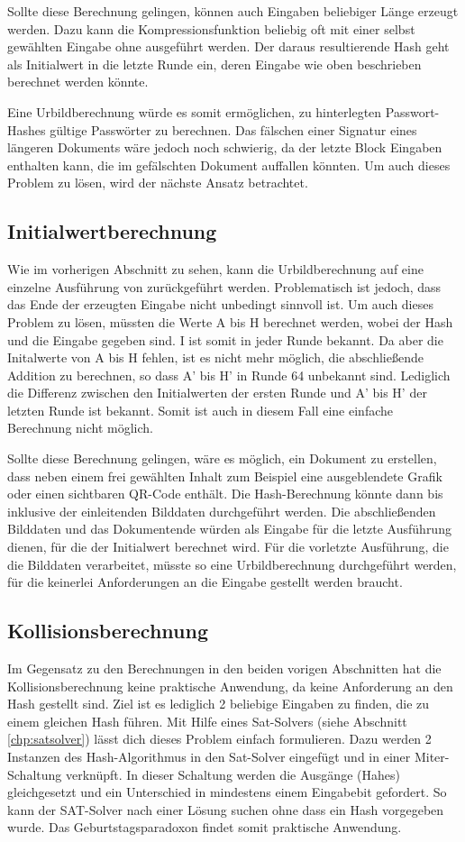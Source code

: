 Sollte diese Berechnung gelingen, können auch Eingaben beliebiger Länge erzeugt werden. Dazu kann die Kompressionsfunktion beliebig oft mit einer selbst gewählten Eingabe
ohne  ausgeführt werden. Der daraus resultierende Hash geht als Initialwert in die letzte Runde ein, deren Eingabe wie oben beschrieben berechnet werden könnte.

Eine Urbildberechnung würde es somit ermöglichen, zu hinterlegten Passwort-Hashes gültige Passwörter zu berechnen. Das fälschen einer Signatur eines längeren Dokuments
wäre jedoch noch schwierig, da der letzte Block Eingaben enthalten kann, die im gefälschten Dokument auffallen könnten. Um auch dieses Problem zu lösen, wird der nächste
Ansatz betrachtet.

\subsection{Initialwertberechnung}
Wie im vorherigen Abschnitt zu sehen, kann die Urbildberechnung auf eine einzelne Ausführung von  zurückgeführt werden.
Problematisch ist jedoch, dass das Ende der erzeugten Eingabe nicht unbedingt sinnvoll ist. Um auch dieses Problem zu lösen, müssten
die Werte A bis H berechnet werden, wobei der Hash und die Eingabe gegeben sind. I ist somit in jeder Runde bekannt. Da aber die Initalwerte
von A bis H fehlen, ist es nicht mehr möglich, die abschließende Addition zu berechnen, so dass A' bis H' in Runde 64 unbekannt sind. Lediglich
die Differenz zwischen den Initialwerten der ersten Runde und A' bis H' der letzten Runde ist bekannt. Somit ist auch in diesem Fall eine
einfache Berechnung nicht möglich.

Sollte diese Berechnung gelingen, wäre es möglich, ein Dokument zu erstellen, dass neben einem frei gewählten Inhalt zum Beispiel eine ausgeblendete
Grafik oder einen sichtbaren QR-Code enthält. Die Hash-Berechnung könnte dann bis inklusive der einleitenden Bilddaten durchgeführt werden.
Die abschließenden Bilddaten und das Dokumentende würden als Eingabe für die letzte Ausführung dienen, für die der Initialwert berechnet wird.
Für die vorletzte Ausführung, die die Bilddaten verarbeitet, müsste so eine Urbildberechnung durchgeführt werden, für die keinerlei Anforderungen
an die Eingabe gestellt werden braucht.

\subsection{Kollisionsberechnung}
Im Gegensatz zu den Berechnungen in den beiden vorigen Abschnitten hat die Kollisionsberechnung keine praktische Anwendung, da keine Anforderung an
den Hash gestellt sind. Ziel ist es lediglich 2 beliebige Eingaben zu finden, die zu einem gleichen Hash führen. Mit Hilfe eines Sat-Solvers
(siehe Abschnitt \ref{chp:satsolver}) lässt dich dieses Problem einfach formulieren. Dazu werden 2 Instanzen des Hash-Algorithmus in den Sat-Solver eingefügt
und in einer Miter-Schaltung \cite{mitergraph} verknüpft. In dieser Schaltung werden die Ausgänge (Hahes) gleichgesetzt und ein Unterschied in mindestens
einem Eingabebit gefordert. So kann der SAT-Solver nach einer Lösung suchen ohne dass ein Hash vorgegeben wurde. Das Geburtstagsparadoxon findet somit
praktische Anwendung.